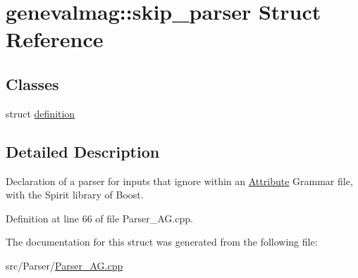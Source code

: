 \hypertarget{structgenevalmag_1_1skip__parser}{
\section{genevalmag::skip\_\-parser Struct Reference}
\label{structgenevalmag_1_1skip__parser}
}
\subsection*{Classes}
\begin{DoxyCompactItemize}
\item 
struct \hyperlink{structgenevalmag_1_1skip__parser_1_1definition}{definition}
\end{DoxyCompactItemize}


\subsection{Detailed Description}
Declaration of a parser for inputs that ignore within an \hyperlink{classgenevalmag_1_1Attribute}{Attribute} Grammar file, with the Spirit library of Boost. 

Definition at line 66 of file Parser\_\-AG.cpp.



The documentation for this struct was generated from the following file:\begin{DoxyCompactItemize}
\item 
src/Parser/\hyperlink{Parser__AG_8cpp}{Parser\_\-AG.cpp}\end{DoxyCompactItemize}
